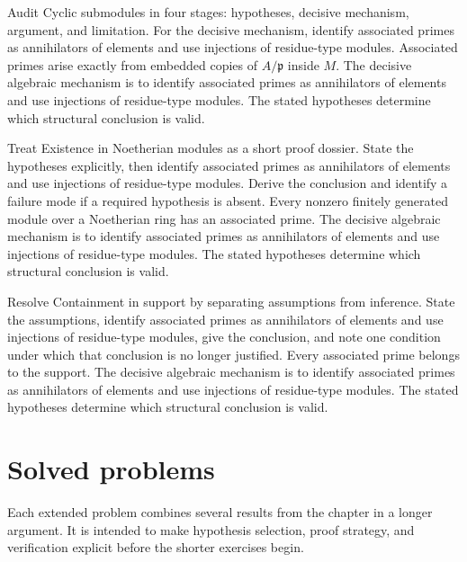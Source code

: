\begin{example}\label{ex:v17-worked-02}
Audit Cyclic submodules in four stages: hypotheses, decisive mechanism, argument, and limitation. For the decisive mechanism, identify associated primes as annihilators of elements and use injections of residue-type modules. Associated primes arise exactly from embedded copies of $A/\mathfrak p$ inside $M$. The decisive algebraic mechanism is to identify associated primes as annihilators of elements and use injections of residue-type modules. The stated hypotheses determine which structural conclusion is valid.
\end{example}

\begin{example}\label{ex:v17-worked-03}
Treat Existence in Noetherian modules as a short proof dossier. State the hypotheses explicitly, then identify associated primes as annihilators of elements and use injections of residue-type modules. Derive the conclusion and identify a failure mode if a required hypothesis is absent. Every nonzero finitely generated module over a Noetherian ring has an associated prime. The decisive algebraic mechanism is to identify associated primes as annihilators of elements and use injections of residue-type modules. The stated hypotheses determine which structural conclusion is valid.
\end{example}

\begin{example}\label{ex:v17-worked-04}
Resolve Containment in support by separating assumptions from inference. State the assumptions, identify associated primes as annihilators of elements and use injections of residue-type modules, give the conclusion, and note one condition under which that conclusion is no longer justified. Every associated prime belongs to the support. The decisive algebraic mechanism is to identify associated primes as annihilators of elements and use injections of residue-type modules. The stated hypotheses determine which structural conclusion is valid.
\end{example}

\section{Solved problems}
Each extended problem combines several results from the chapter in a longer argument. It is intended to make hypothesis selection, proof strategy, and verification explicit before the shorter exercises begin.


